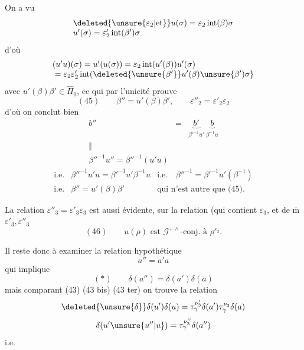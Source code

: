 

On a vu
\[
\begin{array}{l}
\deleted{\unsure{\varepsilon_2|\text{et}}}u(\sigma)
 =\varepsilon_2\operatorname{int}(\beta)\sigma\\
u'(\sigma)=\varepsilon'_2\operatorname{int}(\beta')\sigma
\end{array}
\]
d'où
\[
\begin{array}{l}
(u'u)(\sigma)=u'(u(\sigma))
 =\varepsilon_2\operatorname{int}(u'(\beta))u'(\sigma)\\
\hfill{}=\varepsilon_2\varepsilon'_2
 \operatorname{int}(\deleted{\unsure{\beta'}}u'(\beta)\unsure{\beta')\sigma}
\end{array}
\]
avec \(u'(\beta)\beta'\in\widehat{\Pi}_0\), ce qui par l'unicité prouve
\[
(45)\qquad
\beta''=u'(\beta)\beta',\qquad
\varepsilon''_2=\varepsilon'_2\varepsilon_2
\]
d'où on conclut bien
\[
\begin{array}{ccc}
b''&=&\underbrace{b'}_{\beta'^{-1}u'}\ \underbrace{b}_{\beta^{-1}u}\\
\Vert&&\\
\beta''^{-1}u''=\beta''^{-1}(u'u)&&
\end{array}
\]
\[
\begin{array}{lll}
\text{i.e.}&\beta''^{-1}u'u=\beta'^{-1}u'\beta^{-1}u
 &\text{i.e.}\quad\beta''^{-1}=\beta'^{-1}u'(\beta^{-1})\\
\text{i.e.}&\beta''=u'(\beta)\beta'
 &\text{qui n'est autre que (45).}
\end{array}
\]

La relation \(\varepsilon''_3=\varepsilon'_3\varepsilon_3\) est aussi
évidente,  sur la relation (qui contient \(\varepsilon_3\),
et de \(\overline{\mathrm m}\) \(\varepsilon'_3,\varepsilon''_3\)
\[
(46)\qquad
u(\rho)\text{ est }\mathcal{G}^{+\wedge}\text{-conj. à }\rho^{\varepsilon_3}.
\]

Il reste donc à examiner la relation hypothétique
\[
a''=a'a
\]
qui  implique
\[
(*)\qquad\delta(a'')=\delta(a')\delta(a)
\]
mais comparant (43) (43 bis) (43 ter) on trouve la relation
\[
\deleted{\unsure{\delta}}\delta(u')\delta(u)
 =\tau_\gamma^{\nu'_3}\delta(a')\tau_\gamma^{\nu_3}\delta(a)
\]
\[
\delta(u'\unsure{u''|u})=\tau_\gamma^{\nu''_3}\delta(a'')
\]
\hfill i.e.

